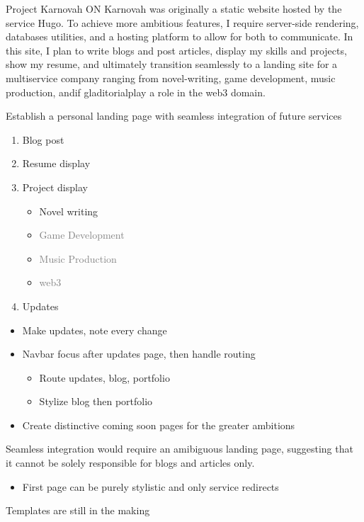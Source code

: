 \documentclass{article}
\begin{document}
\frontmatter
{Project} 
{Karnovah}
{ON}
{Karnovah was originally a static website hosted by the service Hugo. To achieve more ambitious features, I require server-side rendering, databases utilities, and a hosting platform to allow for both to communicate. In this site, I plan to write blogs and post articles, display my skills and projects, show my resume, and ultimately transition seamlessly to a landing site for a multiservice company ranging from novel-writing, game development, music production, and{\textemdash}if gladitorial{\textemdash}play a role in the web3 domain.}

\strategy
{Establish a personal landing page with seamless integration of future services}
{
  \begin{center}
    \begin{enumerate}
      \item Blog post\footnotemark[1]
      \item Resume display\footnotemark[1]
      \item Project display\footnotemark[1]
        \begin{itemize}
          \item Novel writing
          \item \textcolor{gray}{Game Development}
          \item \textcolor{gray}{Music Production}
          \item \textcolor{gray}{web3}
        \end{itemize}
      \item Updates\footnotemark[1]
    \end{enumerate}
  \end{center}
}
{
  \raggedright
  \begin{itemize}
    \item Make updates, note every change
    \item Navbar focus after updates page, then handle routing
      \begin{itemize}
        \item Route updates, blog, portfolio
        \item Stylize blog then portfolio
      \end{itemize}
    \item Create distinctive coming soon pages for the greater ambitions
  \end{itemize}
}
{
  \raggedright
  Seamless integration would require an amibiguous landing page, suggesting that it cannot be solely responsible for blogs and articles only.
  \begin{itemize}
    \item First page can be purely stylistic and only service redirects\footnotemark[2]
  \end{itemize}
}

\deploy
{}
{Templates are still in the making}

\report
{}

\end{document}
